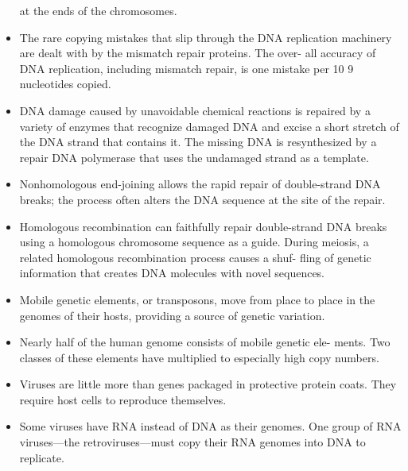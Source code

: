 \begin{itemize}
at the ends of the chromosomes.
\item The rare copying mistakes that slip through the DNA replication
machinery are dealt with by the mismatch repair proteins. The over-
all accuracy of DNA replication, including mismatch repair, is one
mistake per 10 9 nucleotides copied.
\item DNA damage caused by unavoidable chemical reactions is repaired
by a variety of enzymes that recognize damaged DNA and excise a
short stretch of the DNA strand that contains it. The missing DNA is
resynthesized by a repair DNA polymerase that uses the undamaged
strand as a template.
\item Nonhomologous end-joining allows the rapid repair of double-strand
DNA breaks; the process often alters the DNA sequence at the site of
the repair.
\item Homologous recombination can faithfully repair double-strand DNA
breaks using a homologous chromosome sequence as a guide. During
meiosis, a related homologous recombination process causes a shuf-
fling of genetic information that creates DNA molecules with novel
sequences.
\item Mobile genetic elements, or transposons, move from place to place in
the genomes of their hosts, providing a source of genetic variation.
\item Nearly half of the human genome consists of mobile genetic ele-
ments. Two classes of these elements have multiplied to especially
high copy numbers.
\item Viruses are little more than genes packaged in protective protein
coats. They require host cells to reproduce themselves.
\item Some viruses have RNA instead of DNA as their genomes. One group
of RNA viruses—the retroviruses—must copy their RNA genomes into
DNA to replicate.
\end{itemize}
